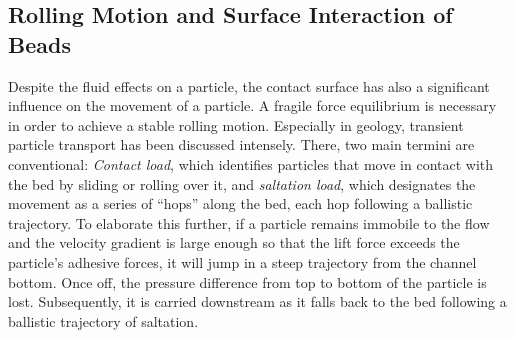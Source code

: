 \subsection{Rolling Motion and Surface Interaction of Beads}
\label{sec:theo:rolling}
Despite the fluid effects on a particle, the contact surface has also a significant influence on the movement of a particle. A fragile force equilibrium is necessary in order to achieve a stable rolling motion.\cite{lit:fluidic:wallInducedForces} Especially in geology, transient particle transport has been discussed intensely. There, two main termini are conventional: \textit{Contact load}, which identifies particles that move in contact with the bed by sliding or rolling over it, and \textit{saltation load}, which designates the movement as a series of “hops” along the bed, each hop following a ballistic trajectory. To elaborate this further, if a particle remains immobile to the flow and the velocity gradient is large enough so that the lift force exceeds the particle’s adhesive forces, it will jump in a steep trajectory from the channel bottom. Once off, the pressure difference from top to bottom of the particle is lost. Subsequently, it is carried downstream as it falls back to the bed following a ballistic trajectory of saltation.

